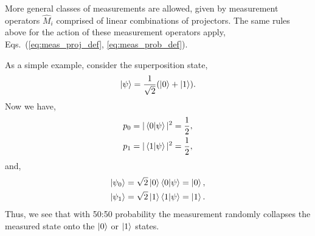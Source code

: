 \documentclass[aps,pra,twocolumn,amsmath,amssymb,nofootinbib,superscriptaddress]{revtex4}
\begin{document}
More general classes of measurements are allowed, given by measurement operators $\hat{M}_i$ comprised of linear combinations of projectors. The same rules above for the action of these measurement operators apply, Eqs.~(\ref{eq:meas_proj_def}, \ref{eq:meas_prob_def}).

As a simple example, consider the superposition state,
\begin{align}
\ket\psi = \frac{1}{\sqrt{2}}(\ket{0}+\ket{1}).	
\end{align}
Now we have,
\begin{align}
p_0 = |\braket{0|\psi}|^2 = \frac{1}{2},\nonumber\\
p_1 = |\braket{1|\psi}|^2 = \frac{1}{2},
\end{align}
and,
\begin{align}
\ket{\psi_0} &= \sqrt{2}\ket{0}\braket{0|\psi} = \ket{0},\nonumber\\
\ket{\psi_1} &= \sqrt{2}\ket{1}\braket{1|\psi} = \ket{1}.
\end{align}
Thus, we see that with 50:50 probability the measurement randomly collapses the measured state onto the $\ket{0}$ or $\ket{1}$ states.
\end{document}
